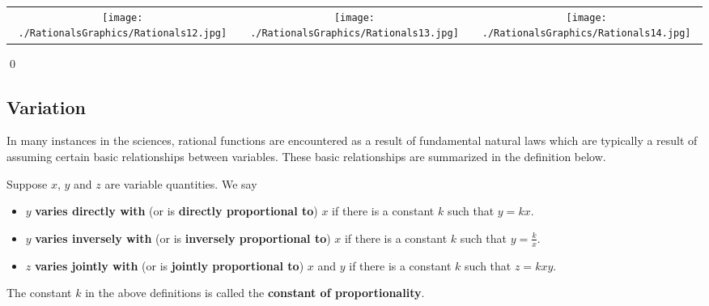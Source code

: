 \begin{ex}
\begin{enumerate}
\begin{center}

\begin{tabular}{ccc}

\texttt{[image: ./RationalsGraphics/Rationals12.jpg]}  & \texttt{[image: ./RationalsGraphics/Rationals13.jpg]} & \texttt{[image: ./RationalsGraphics/Rationals14.jpg]} \\


\end{tabular}
\end{center} 

\end{enumerate}
\qed

\end{ex}


\subsection{Variation}
\label{Variation}

In many instances in the sciences, rational functions are encountered as a result of fundamental natural laws which are typically a result of assuming certain basic relationships between variables.  These basic relationships are summarized in the definition below.

\smallskip

\colorbox{ResultColor}{\bbm

\begin{defn} \label{variation}  Suppose $x$, $y$ and $z$ are variable quantities.  We say

\begin{itemize}

\item  $y$ \textbf{varies directly with} (or is \textbf{directly proportional to}) $x$ if there is a constant $k$ such that $y=kx$.

\item  $y$ \textbf{varies inversely with} (or is \textbf{inversely proportional to}) $x$ if there is a constant $k$ such that $y=\frac{k}{x}$.

\item  $z$ \textbf{varies jointly with} (or is \textbf{jointly proportional to}) $x$ and $y$ if there is a constant $k$ such that $z = kxy$.


\end{itemize}

The constant $k$ in the above definitions is called the \textbf{constant of proportionality}.

\end{defn}

\ebm}

